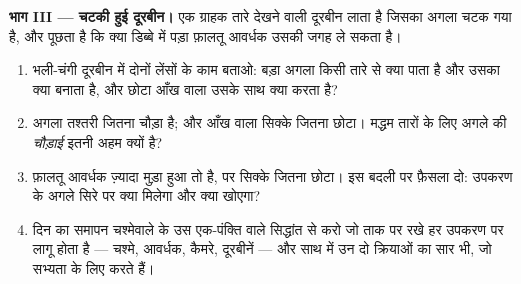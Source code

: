 \begin{problem}
\medskip\noindent\textbf{भाग III --- चटकी हुई दूरबीन।}
एक ग्राहक तारे देखने वाली दूरबीन लाता है जिसका अगला  चटक गया है,
और पूछता है कि क्या डिब्बे में पड़ा फ़ालतू आवर्धक उसकी जगह ले सकता है।
\begin{enumerate}[resume]
  \item भली-चंगी दूरबीन में दोनों लेंसों के काम बताओ: बड़ा अगला 
        किसी तारे से क्या पाता है और उसका क्या बनाता है, और छोटा
        आँख वाला  उसके साथ क्या करता है?
  \item अगला  तश्तरी जितना चौड़ा है; और आँख वाला  सिक्के
        जितना छोटा। मद्धम तारों के लिए अगले  की \emph{चौड़ाई}
        इतनी अहम क्यों है?
  \item फ़ालतू आवर्धक ज़्यादा मुड़ा हुआ तो है, पर सिक्के जितना छोटा।
        इस बदली पर फ़ैसला दो: उपकरण के अगले सिरे पर क्या मिलेगा और
        क्या खोएगा?
  \item दिन का समापन चश्मेवाले के उस एक-पंक्ति वाले सिद्धांत से करो
        जो ताक पर रखे हर उपकरण पर लागू होता है --- चश्मे, आवर्धक,
        कैमरे, दूरबीनें --- और साथ में उन दो क्रियाओं का सार भी, जो
         सभ्यता के लिए करते हैं।
\end{enumerate}
\end{problem}
